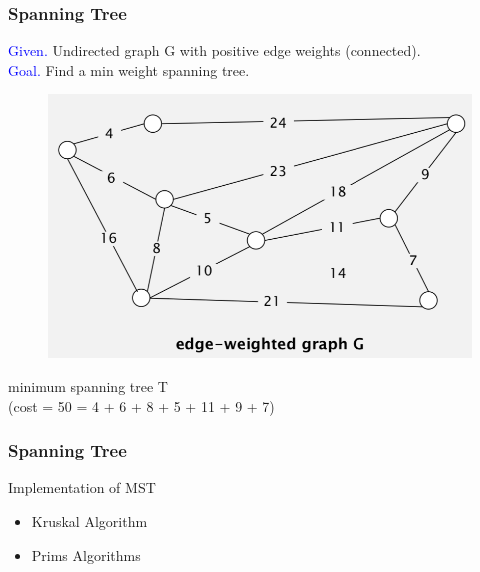 \documentclass[11pt]{beamer}
\begin{document}
 \begin{frame}
	\frametitle	{Spanning Tree} 
	\textcolor{blue}{Given. } Undirected graph G with positive edge weights (connected). \\
	\textcolor{blue}{Goal. }  Find a min weight spanning tree.
	\begin{figure}
		\centering
		\includegraphics[width=0.6\linewidth]{"Screenshot 2020-12-15 at 1.48.15 PM"}
		\label{fig:screenshot-2020-12-15-at-1}
	\end{figure}
	minimum spanning tree T\\
	(cost = 50 = 4 + 6 + 8 + 5 + 11 + 9 + 7)
\end{frame}

\begin{frame}
	\frametitle	{Spanning Tree} 
    \begin{block}{Implementation of MST}
    	\begin{itemize}
    		\item Kruskal Algorithm
    		\item Prims Algorithms
    	\end{itemize}
    \end{block}
\end{frame}
\end{document}
